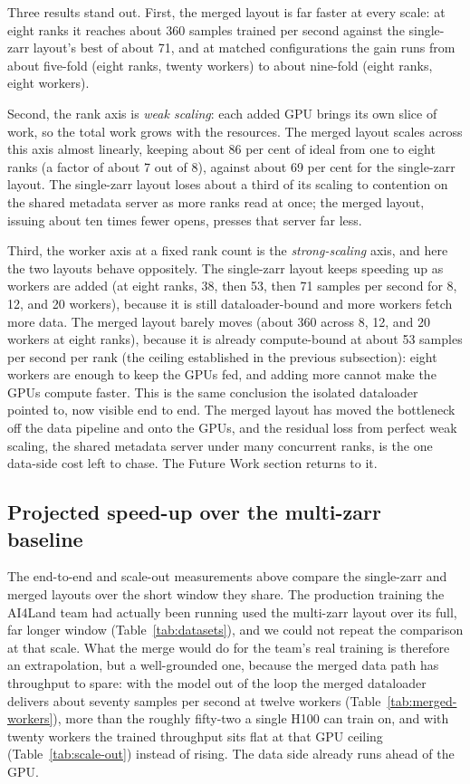 \documentclass[12pt,a4paper]{article}
\begin{document}
Three results stand out. First, the merged layout is far faster at every scale: at eight
ranks it reaches about 360 samples trained per second against the single-zarr layout's best
of about 71, and at matched configurations the gain runs from about five-fold (eight ranks,
twenty workers) to about nine-fold (eight ranks, eight workers).

Second, the rank axis is \emph{weak scaling}: each added GPU brings its own slice of work,
so the total work grows with the resources. The merged layout scales across this axis almost
linearly, keeping about 86 per cent of ideal from one to eight ranks (a factor of about 7
out of 8), against about 69 per cent for the single-zarr layout. The single-zarr layout
loses about a third of its scaling to contention on the shared metadata server as more ranks
read at once; the merged layout, issuing about ten times fewer opens, presses that server
far less.

Third, the worker axis at a fixed rank count is the \emph{strong-scaling} axis, and here the
two layouts behave oppositely. The single-zarr layout keeps speeding up as workers are added
(at eight ranks, 38, then 53, then 71 samples per second for 8, 12, and 20 workers), because
it is still dataloader-bound and more workers fetch more data. The merged layout barely
moves (about 360 across 8, 12, and 20 workers at eight ranks), because it is already
compute-bound at about 53 samples per second per rank (the ceiling established in the
previous subsection): eight workers are enough to keep the GPUs fed, and adding more cannot
make the GPUs compute faster.
This is the same conclusion the isolated dataloader pointed to, now visible end to end. The
merged layout has moved the bottleneck off the data pipeline and onto the GPUs, and the
residual loss from perfect weak scaling, the shared metadata server under many concurrent
ranks, is the one data-side cost left to chase. The Future Work section returns to it.

\subsection{Projected speed-up over the multi-zarr baseline}\label{subsec:projection}

The end-to-end and scale-out measurements above compare the single-zarr and merged layouts over
the short window they share. The production training the AI4Land team had actually been running
used the multi-zarr layout over its full, far longer window (Table~\ref{tab:datasets}), and we
could not repeat the comparison at that scale. What the merge would do for the team's real
training is therefore an extrapolation, but a well-grounded one, because the merged data path has
throughput to spare: with the model out of the loop the merged dataloader delivers about seventy
samples per second at twelve workers (Table~\ref{tab:merged-workers}), more than the roughly
fifty-two a single H100 can train on, and with twenty workers the trained throughput sits flat at
that GPU ceiling (Table~\ref{tab:scale-out}) instead of rising. The data side already runs ahead
of the GPU.
\end{document}
